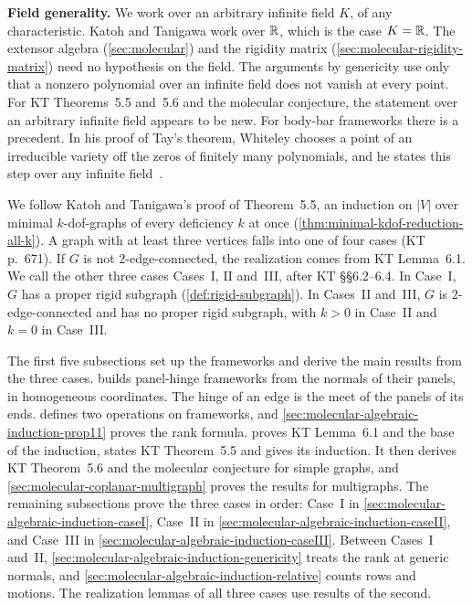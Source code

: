 \medskip
\noindent\textbf{Field generality.} We work over an arbitrary infinite
field $K$, of any characteristic. Katoh and Tanigawa work over ${\mathbb{R}}$,
which is the case $K = {\mathbb{R}}$. The extensor algebra
(\cref{sec:molecular}) and the rigidity matrix
(\cref{sec:molecular-rigidity-matrix}) need no hypothesis on the field.
The arguments by genericity use only that a nonzero polynomial over an
infinite field does not vanish at every point. For KT Theorems~5.5
and~5.6 and the molecular conjecture, the statement over an arbitrary
infinite field appears to be new. For body-bar frameworks there is a
precedent. In his proof of Tay's theorem, Whiteley chooses a point of an
irreducible variety off the zeros of finitely many polynomials, and he
states this step over any infinite
field~\cite[Proposition~6 and Lemma~7]{whiteley1988}.

\medskip
We follow Katoh and Tanigawa's proof of Theorem~5.5, an induction on
$|V|$ over minimal $k$-dof-graphs of every deficiency $k$ at once
(\cref{thm:minimal-kdof-reduction-all-k}). A graph with at least three
vertices falls into one of four cases (KT p.~671). If $G$ is not
$2$-edge-connected, the realization comes from KT Lemma~6.1. We call the
other three cases Cases~I, II and~III, after KT \S\S6.2--6.4. In Case~I,
$G$ has a proper rigid subgraph (\cref{def:rigid-subgraph}). In Cases~II
and~III, $G$ is $2$-edge-connected and has no proper rigid subgraph, with
$k > 0$ in Case~II and $k = 0$ in Case~III.

The first five subsections set up the frameworks and derive the main
results from the three cases.
 builds panel-hinge
frameworks from the normals of their panels, in homogeneous coordinates.
The hinge of an edge is the meet of the panels of its ends.
 defines two
operations on frameworks, and
\cref{sec:molecular-algebraic-induction-prop11} proves the rank formula.
 proves KT Lemma~6.1 and
the base of the induction, states KT Theorem~5.5 and gives its
induction. It then derives KT Theorem~5.6 and the molecular conjecture
for simple graphs, and \cref{sec:molecular-coplanar-multigraph}
proves the results for multigraphs. The remaining subsections prove the
three cases in order: Case~I in
\cref{sec:molecular-algebraic-induction-caseI}, Case~II in
\cref{sec:molecular-algebraic-induction-caseII}, and Case~III in
\cref{sec:molecular-algebraic-induction-caseIII}. Between Cases~I
and~II, \cref{sec:molecular-algebraic-induction-genericity} treats the
rank at generic normals, and
\cref{sec:molecular-algebraic-induction-relative} counts rows and
motions. The realization lemmas of all three cases use results of the
second.






